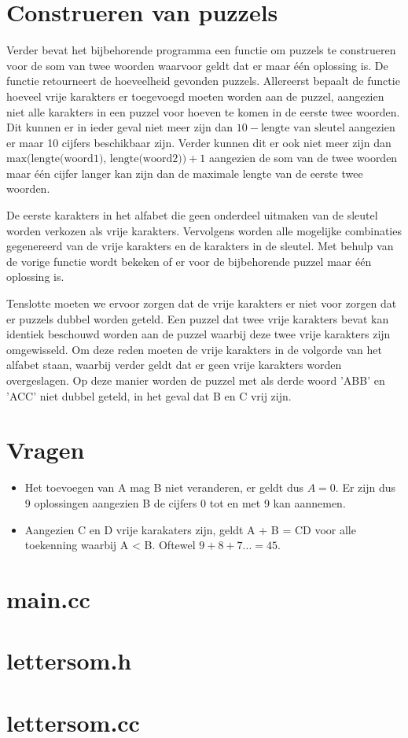 \documentclass{article}
\begin{document}
\section{Construeren van puzzels}

Verder bevat het bijbehorende programma een functie om puzzels te construeren voor de som van twee woorden waarvoor geldt dat er maar \'e\'en oplossing is. De functie retourneert de hoeveelheid gevonden puzzels. Allereerst bepaalt de functie hoeveel vrije karakters er toegevoegd moeten worden aan de puzzel, aangezien niet alle karakters in een puzzel voor hoeven te komen in de eerste twee woorden. Dit kunnen er in ieder geval niet meer zijn dan $10 - \text{lengte van sleutel}$ aangezien er maar 10 cijfers beschikbaar zijn. Verder kunnen dit er ook niet meer zijn dan $\text{max(lengte(woord1), lengte(woord2))} + 1$ aangezien de som van de twee woorden maar \'e\'en cijfer langer kan zijn dan de maximale lengte van de eerste twee woorden.

De eerste karakters in het alfabet die geen onderdeel uitmaken van de sleutel worden verkozen als vrije karakters. Vervolgens worden alle mogelijke combinaties gegenereerd van de vrije karakters en de karakters in de sleutel. Met behulp van de vorige functie wordt bekeken of er voor de bijbehorende puzzel maar \'e\'en oplossing is.

Tenslotte moeten we ervoor zorgen dat de vrije karakters er niet voor zorgen dat er puzzels dubbel worden geteld. Een puzzel dat twee vrije karakters bevat kan identiek beschouwd worden aan de puzzel waarbij deze twee vrije karakters zijn omgewisseld. Om deze reden moeten de vrije karakters in de volgorde van het alfabet staan, waarbij verder geldt dat er geen vrije karakters worden overgeslagen. Op deze manier worden de puzzel met als derde woord 'ABB' en 'ACC' niet dubbel geteld, in het geval dat B en C vrij zijn.

\section{Vragen}

\begin{itemize}
  \item Het toevoegen van A mag B niet veranderen, er geldt dus $A = 0$. Er zijn dus 9 oplossingen aangezien B de cijfers 0 tot en met 9 kan aannemen.
  \item Aangezien C en D vrije karakaters zijn, geldt A + B = CD voor alle toekenning waarbij A < B. Oftewel $9 + 8 + 7 ... = 45$.
\end{itemize}

\section{main.cc}



\section{lettersom.h}



\section{lettersom.cc}


\end{document}
